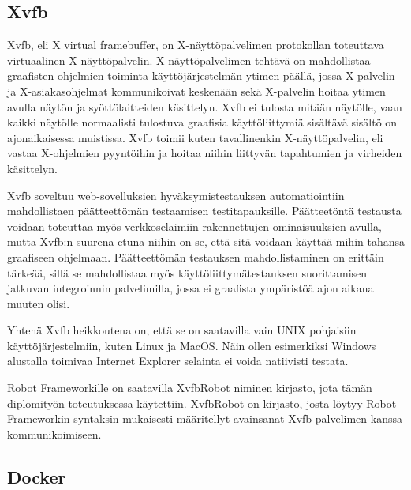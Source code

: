   \subsection{Xvfb} \label{ch:08_xvfb}

    Xvfb, eli X virtual framebuffer, on X-näyttöpalvelimen protokollan toteuttava virtuaalinen X-näyttöpalvelin.
    X-näyttöpalvelimen tehtävä on mahdollistaa graafisten ohjelmien toiminta käyttöjärjestelmän ytimen päällä, jossa X-palvelin ja X-asiakasohjelmat kommunikoivat keskenään sekä X-palvelin hoitaa ytimen avulla näytön ja syöttölaitteiden käsittelyn.
    Xvfb ei tulosta mitään näytölle, vaan kaikki näytölle normaalisti tulostuva graafisia käyttöliittymiä sisältävä sisältö on ajonaikaisessa muistissa.
    Xvfb toimii kuten tavallinenkin X-näyttöpalvelin, eli vastaa X-ohjelmien pyyntöihin ja hoitaa niihin liittyvän tapahtumien ja virheiden käsittelyn.

    Xvfb soveltuu web-sovelluksien hyväksymistestauksen automatiointiin mahdollistaen päätteettömän testaamisen testitapauksille.
    Päätteetöntä testausta voidaan toteuttaa myös verkkoselaimiin rakennettujen ominaisuuksien avulla, mutta Xvfb:n suurena etuna niihin on se, että sitä voidaan käyttää mihin tahansa graafiseen ohjelmaan.
    Päätteettömän testauksen mahdollistaminen on erittäin tärkeää, sillä se mahdollistaa myös käyttöliittymätestauksen suorittamisen jatkuvan integroinnin palvelimilla, jossa ei graafista ympäristöä ajon aikana muuten olisi.


    Yhtenä Xvfb heikkoutena on, että se on saatavilla vain UNIX pohjaisiin käyttöjärjestelmiin, kuten Linux ja MacOS.
    Näin ollen esimerkiksi Windows alustalla toimivaa Internet Explorer selainta ei voida natiivisti testata.

    Robot Frameworkille on saatavilla XvfbRobot niminen kirjasto, jota tämän diplomityön toteutuksessa käytettiin.
    XvfbRobot on kirjasto, josta löytyy Robot Frameworkin syntaksin mukaisesti määritellyt avainsanat Xvfb palvelimen kanssa kommunikoimiseen.

  \subsection{Docker} \label{ch:08_docker}

